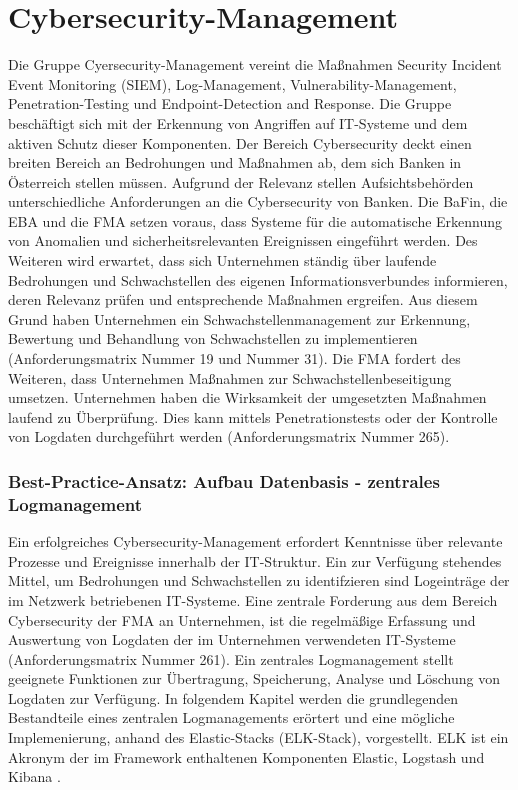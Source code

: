 \section{Cybersecurity-Management}
\label{Vulnerability-Management}
Die Gruppe \glqq{}Cyersecurity-Management\grqq{} vereint die Maßnahmen \glqq{}Security Incident Event Monitoring\grqq{} (SIEM), \glqq{}Log-Management\grqq{}, \glqq{}Vulnerability-Management\grqq{}, \\\glqq{}Penetration-Testing\grqq{} und \glqq{}Endpoint-Detection and Response\grqq{}. Die Gruppe beschäftigt sich mit der Erkennung von Angriffen auf IT-Systeme und dem aktiven Schutz dieser Komponenten.
\bigbreak
Der Bereich \glqq{}Cybersecurity\grqq{} deckt einen breiten Bereich an Bedrohungen und Maßnahmen ab, dem sich Banken in Österreich stellen müssen. Aufgrund der Relevanz stellen Aufsichtsbehörden unterschiedliche Anforderungen an die Cybersecurity von Banken. Die BaFin, die EBA und die FMA setzen voraus, dass Systeme für die automatische Erkennung von Anomalien und sicherheitsrelevanten Ereignissen eingeführt werden. Des Weiteren wird erwartet, dass sich Unternehmen ständig über laufende Bedrohungen und Schwachstellen des eigenen Informationsverbundes informieren, deren Relevanz prüfen und entsprechende Maßnahmen ergreifen. Aus diesem Grund haben Unternehmen ein Schwachstellenmanagement zur Erkennung, Bewertung und Behandlung von Schwachstellen zu implementieren (Anforderungsmatrix Nummer 19 und Nummer 31). Die FMA fordert des Weiteren, dass Unternehmen Maßnahmen zur Schwachstellenbeseitigung umsetzen. Unternehmen haben die Wirksamkeit der umgesetzten Maßnahmen laufend zu Überprüfung. Dies kann mittels Penetrationstests oder der Kontrolle von Logdaten durchgeführt werden (Anforderungsmatrix Nummer 265). 
\bigbreak
\subsubsection{Best-Practice-Ansatz: Aufbau Datenbasis - zentrales Logmanagement}
Ein erfolgreiches Cybersecurity-Management erfordert Kenntnisse über relevante Prozesse und Ereignisse innerhalb der IT-Struktur. Ein zur Verfügung stehendes Mittel, um Bedrohungen und Schwachstellen zu identifzieren sind Logeinträge der im Netzwerk betriebenen IT-Systeme. Eine zentrale Forderung aus dem Bereich Cybersecurity der FMA an Unternehmen, ist die regelmäßige Erfassung und Auswertung von Logdaten der im Unternehmen verwendeten IT-Systeme (Anforderungsmatrix Nummer 261). Ein zentrales Logmanagement stellt geeignete Funktionen zur Übertragung, Speicherung, Analyse und Löschung von Logdaten zur Verfügung. 
\bigbreak
In folgendem Kapitel werden die grundlegenden Bestandteile eines zentralen Logmanagements erörtert und eine mögliche Implemenierung, anhand des \glqq{}Elastic-Stacks\grqq{} (ELK-Stack), vorgestellt. \glqq{}ELK\grqq{} ist ein Akronym der im Framework enthaltenen Komponenten \glqq{}Elastic\grqq{}, \glqq{}Logstash\grqq{} und \glqq{}Kibana\grqq{} \autocite{ELK_Stack}.
\bigbreak

